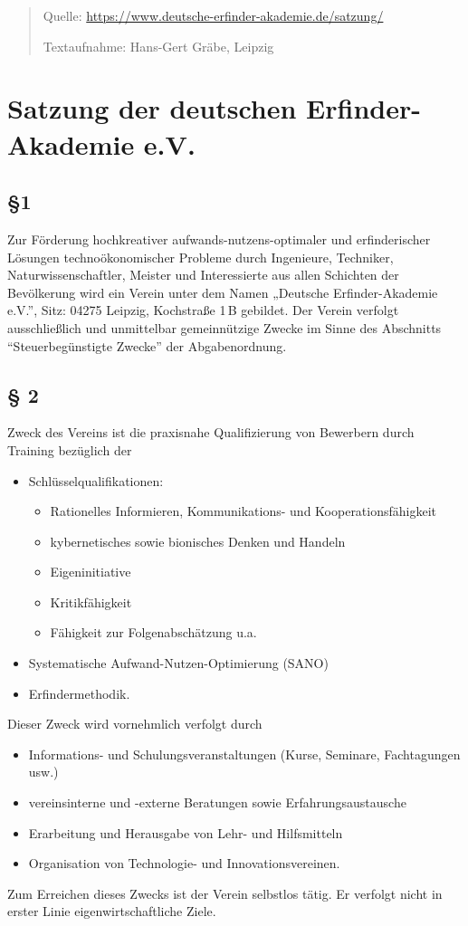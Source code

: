 \documentclass[11pt,a4paper]{article}
\begin{document}
\begin{quote}
  Quelle: \url{https://www.deutsche-erfinder-akademie.de/satzung/}

  Textaufnahme: Hans-Gert Gräbe, Leipzig
\end{quote}

\section*{\centering Satzung der deutschen Erfinder-Akademie e.V.}

\subsection*{§1}
Zur Förderung hochkreativer aufwands-nutzens-optimaler und erfinderischer
Lösungen technoökonomischer Probleme durch Ingenieure, Techniker,
Naturwissenschaftler, Meister und Interessierte aus allen Schichten der
Bevölkerung wird ein Verein unter dem Namen „Deutsche Erfinder-Akademie e.V.”,
Sitz: 04275 Leipzig, Kochstraße 1\,B gebildet. Der Verein verfolgt
ausschließlich und unmittelbar gemeinnützige Zwecke im Sinne des Abschnitts
“Steuerbegünstigte Zwecke” der Abgabenordnung.

\subsection*{§ 2}
Zweck des Vereins ist die praxisnahe Qualifizierung von Bewerbern durch
Training bezüglich der
\begin{itemize}
\item Schlüsselqualifikationen:
  \begin{itemize}
  \item Rationelles Informieren, Kommunikations- und Kooperationsfähigkeit
  \item kybernetisches sowie bionisches Denken und Handeln
  \item Eigeninitiative
  \item Kritikfähigkeit
  \item Fähigkeit zur Folgenabschätzung u.a.
  \end{itemize}
\item Systematische Aufwand-Nutzen-Optimierung (SANO)
\item Erfindermethodik.
\end{itemize}
Dieser Zweck wird vornehmlich verfolgt durch
\begin{itemize}
\item Informations- und Schulungsveranstaltungen (Kurse, Seminare,
  Fachtagungen usw.)
\item vereinsinterne und -externe Beratungen sowie Erfahrungsaustausche
\item Erarbeitung und Herausgabe von Lehr- und Hilfsmitteln
\item Organisation von Technologie- und Innovationsvereinen.
\end{itemize}
Zum Erreichen dieses Zwecks ist der Verein selbstlos tätig. Er verfolgt nicht
in erster Linie eigenwirtschaftliche Ziele.
\end{document}
